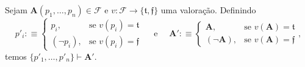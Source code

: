 \begin{lemma}[Kalmár] \label{lem.fund:troca}
    Sejam $\mathbf{A}(p_1, \ldots, p_n) \in \mathcal{F}$ e $v : \mathcal{F} \to \{\mathfrak{t}, \mathfrak{f} \}$ uma valoração. Definindo
        \[
            p'_i :\equiv
                \begin{cases}
                    p_i, & \text{se } v(p_i) = \mathfrak{t} \\
                    (\neg p_i), & \text{se } v(p_i) = \mathfrak{f}
                \end{cases}
            \quad \text{ e } \quad
            \mathbf{A}' :\equiv
                \begin{cases}
                    \mathbf{A}, & \text{se } v(\mathbf{A}) = \mathfrak{t} \\
                    (\neg \mathbf{A}), & \text{se } v(\mathbf{A}) = \mathfrak{f}
                \end{cases},
        \]
    temos $\{p'_1, \ldots, p'_n \} \vdash \mathbf{A}'$.
\end{lemma}

